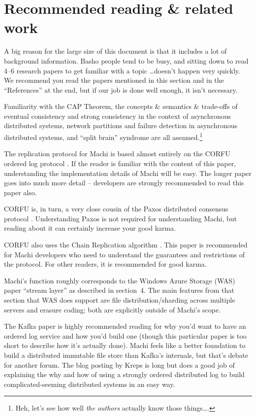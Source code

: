 \documentclass[preprint,10pt]{sigplanconf}
\begin{document}
\section{Recommended reading \& related work}

A big reason for the large size of this document is that it includes a
lot of background information.
Basho people tend to be busy, and sitting down to
read 4--6 research papers to get familiar with a topic \ldots doesn't
happen very quickly.  We recommend you read the papers mentioned in
this section and in the ``References'' at the end, but if our job is
done well enough, it isn't necessary.

Familiarity with the CAP Theorem, the concepts \& semantics \&
trade-offs of eventual consistency and strong consistency in the
context of asynchronous distributed systems, network partitions and
failure detection in asynchronous distributed systems, and ``split
brain'' syndrome are all assumed.\footnote{Heh, let's see how well
{\em the authors} actually know those things\ldots.}

The replication protocol for Machi is based almost entirely on the CORFU
ordered log protocol \cite{corfu1}.  If the reader is familiar with
the content of this paper, understanding the implementation details of
Machi will be easy.  The longer paper \cite{corfu2} goes into much
more detail -- developers are strongly recommended to read this paper
also.

CORFU is, in turn, a very close cousin of the Paxos distributed
consensus protocol \cite{paxos-made-simple}.  Understanding Paxos is
not required for understanding Machi, but reading about it can certainly
increase your good karma.

CORFU also uses the Chain Replication algorithm
\cite{chain-replication}.  This paper is recommended for Machi
developers who need to understand the guarantees and restrictions of
the protocol.  For other readers, it is recommended for good karma.

 Machi's function
roughly corresponds to the Windows Azure Storage (WAS) paper \cite{was}
``stream layer'' as described in section~4.
The main features from that section that WAS does support are file
distribution/sharding across multiple servers and erasure coding; both
are explicitly outside of Machi's scope.

The Kafka paper \cite{kafka} is highly recommended reading for why
you'd want to have an ordered log service and how you'd build one
(though this particular paper is too short to describe how it's
actually done).
Machi feels like a better foundation to build a
distributed immutable file store than Kafka's internals, but
that's debate for another forum.  The blog posting by Kreps
\cite{the-log-what} is long but does a good job of explaining
the why and how of using a strongly ordered distributed log to build
complicated-seeming distributed systems in an easy way.
\end{document}
